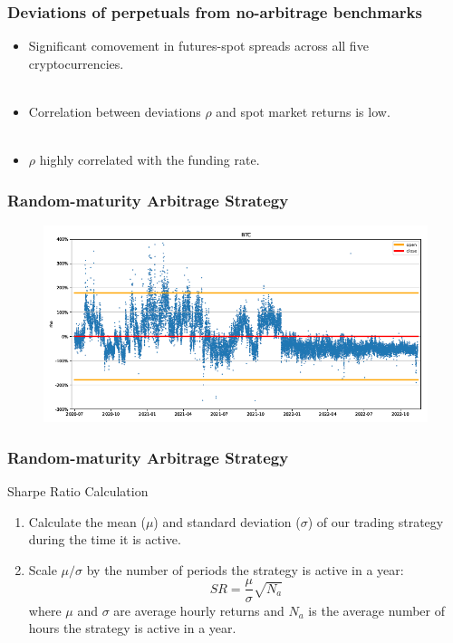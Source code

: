 \documentclass{beamer}
\begin{document}
\begin{frame}
\frametitle{Deviations of perpetuals from no-arbitrage benchmarks}
\begin{itemize}
    \item Significant comovement in futures-spot spreads across all five cryptocurrencies.\\~\\
    \item Correlation between deviations $\rho$ and spot market returns is low.\\~\\
    \item $\rho$ highly correlated with the funding rate.
\end{itemize}
\end{frame}

\begin{frame}
\frametitle{Random-maturity Arbitrage Strategy}
\begin{figure}
    \includegraphics[width=0.75\linewidth]{figs/Figure5.png}
\end{figure}
\end{frame}

\begin{frame}
\frametitle{Random-maturity Arbitrage Strategy}
Sharpe Ratio Calculation
\begin{enumerate}[i]
    \item Calculate the mean ($\mu$) and standard deviation ($\sigma$) of our trading strategy during the time it is active. 
    \item Scale $\mu/\sigma$ by the number of periods the strategy is active in a year: $$SR=\frac{\mu}{\sigma}\sqrt{N_a}$$ where $\mu$ and $\sigma$ are average hourly returns and $N_a$ is the average number of hours the strategy is active in a year.
\end{enumerate}
\end{frame}
\end{document}

